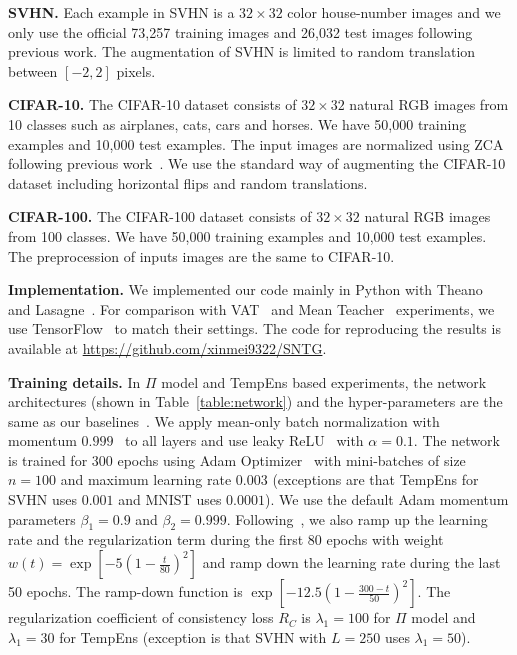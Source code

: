 \documentclass[10pt,twocolumn,letterpaper]{article}
\begin{document}
\textbf{SVHN.}
Each example in SVHN is a $32\times32$ color house-number images and we only use the official 73,257 training images and 26,032 test images following previous work.
The augmentation of SVHN is limited to random translation between $[-2,2]$ pixels.

\textbf{CIFAR-10.}
The CIFAR-10 dataset consists of $32\times32$ natural RGB images from 10 classes such as airplanes, cats, cars and horses. We have 50,000 training examples and 10,000 test examples. The input images are normalized using ZCA following previous work~\cite{laine2016temporal}.
We use the standard way of augmenting the CIFAR-10 dataset including horizontal flips and random translations.

\textbf{CIFAR-100.}
The CIFAR-100 dataset consists of $32\times32$ natural RGB images from 100 classes. We have 50,000 training examples and 10,000 test examples. The preprocession of inputs images are the same to CIFAR-10.

\textbf{Implementation.}
We implemented our code mainly in Python with Theano~\cite{2016arXiv160502688short} and Lasagne~\cite{lasagne}. For comparison with VAT~\cite{miyato2017virtual} and Mean Teacher~\cite{tarvainen2017mean} experiments, we use TensorFlow~\cite{abadi2016tensorflow} to match their settings.
The code for reproducing the results is available at \url{https://github.com/xinmei9322/SNTG}.

\textbf{Training details.}
In $\Pi$ model and TempEns based experiments, the network architectures (shown in Table~\ref{table:network}) and the hyper-parameters are the same as our baselines~\cite{laine2016temporal}.
We apply mean-only batch normalization with momentum $0.999$~\cite{salimans2016weight} to all layers and use leaky ReLU~\cite{maas2013rectifier} with $\alpha=0.1$.
The network is trained for $300$ epochs using Adam Optimizer~\cite{kingma2014adam} with mini-batches of size $n=100$ and maximum learning rate $0.003$ (exceptions are that TempEns for SVHN uses $0.001$ and MNIST uses $0.0001$). We use the default Adam momentum parameters $\beta_1=0.9$ and $\beta_2=0.999$. Following~\cite{laine2016temporal}, we also ramp up the learning rate and the regularization term during the first 80 epochs with weight $w(t) = \exp\left[-5(1-\frac{t}{80})^2\right]$ and ramp down the learning rate during the last 50 epochs. The ramp-down function is $\exp\left[-12.5(1 - \frac{300- t}{50})^2\right]$.
The regularization coefficient of consistency loss $R_C$ is $\lambda_1=100$ for $\Pi$ model and $\lambda_1=30$ for TempEns (exception is that SVHN with $L=250$ uses $\lambda_1=50$).
\end{document}
